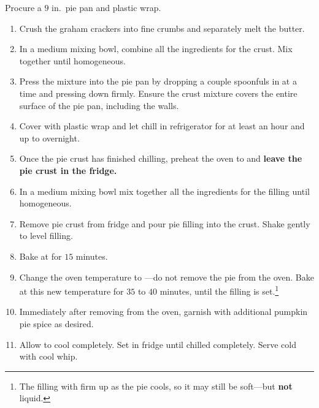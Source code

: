 \instructions
Procure a $9$ in.\ pie pan and plastic wrap.
\begin{enumerate}
    \item Crush the graham crackers into fine crumbs and separately melt the butter.
    \item In a medium mixing bowl, combine all the ingredients for the crust. Mix together until homogeneous.
    \item Press the mixture into the pie pan by dropping a couple spoonfuls in at a time and pressing down firmly. Ensure the crust mixture covers the entire surface of the pie pan, including the walls.
    \item Cover with plastic wrap and let chill in refrigerator for at least an hour and up to overnight.
    \item Once the pie crust has finished chilling, preheat the oven to  and \textbf{leave the pie crust in the fridge.}
    \item In a medium mixing bowl mix together all the ingredients for the filling until homogeneous.
    \item Remove pie crust from fridge and pour pie filling into the crust. Shake gently to level filling.
    \item Bake at  for $15$ minutes.
    \item Change the oven temperature to ---do not remove the pie from the oven. Bake at this new temperature for $35$ to $40$ minutes, until the filling is set.\renewcommand{\thefootnote}{\fnsymbol{footnote}}\footnote[2]{The filling with firm up as the pie cools, so it may still be soft---but \textbf{not} liquid.}\renewcommand{\thefootnote}{\arabic{footnote}}
    \item Immediately after removing from the oven, garnish with additional pumpkin pie spice as desired.
    \item Allow to cool completely. Set in fridge until chilled completely. Serve cold with cool whip.
\end{enumerate}

\spewfootnotes


